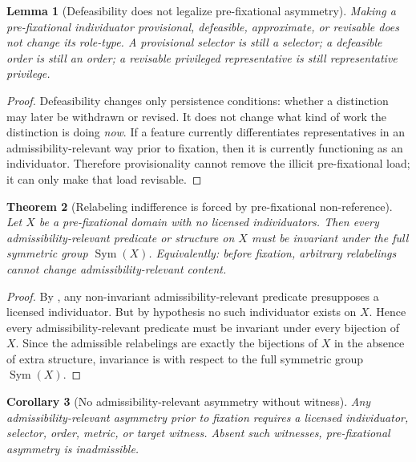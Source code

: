 \documentclass[11pt]{article}
\newtheorem{theorem}{Theorem}[section]
\newtheorem{lemma}[theorem]{Lemma}
\newtheorem{corollary}[theorem]{Corollary}
\theoremstyle{definition}
\begin{document}
\begin{lemma}[Defeasibility does not legalize pre-fixational asymmetry]
\label{lem:defeasibility-not-enough}
Making a pre-fixational individuator provisional, defeasible, approximate, or revisable does not change its role-type.
A provisional selector is still a selector; a defeasible order is still an order; a revisable privileged representative is still representative privilege.
\end{lemma}

\begin{proof}
Defeasibility changes only persistence conditions: whether a distinction may later be withdrawn or revised.
It does not change what kind of work the distinction is doing \emph{now}.
If a feature currently differentiates representatives in an admissibility-relevant way prior to fixation, then it is currently functioning as an individuator.
Therefore provisionality cannot remove the illicit pre-fixational load; it can only make that load revisable.
\end{proof}

\begin{theorem}[Relabeling indifference is forced by pre-fixational non-reference]
\label{thm:relabeling-forced}
Let $X$ be a pre-fixational domain with no licensed individuators.
Then every admissibility-relevant predicate or structure on $X$ must be invariant under the full symmetric group $\operatorname{Sym}(X)$.
Equivalently: before fixation, arbitrary relabelings cannot change admissibility-relevant content.
\end{theorem}

\begin{proof}
By , any non-invariant admissibility-relevant predicate presupposes a licensed individuator.
But by hypothesis no such individuator exists on $X$.
Hence every admissibility-relevant predicate must be invariant under every bijection of $X$.
Since the admissible relabelings are exactly the bijections of $X$ in the absence of extra structure, invariance is with respect to the full symmetric group $\operatorname{Sym}(X)$.
\end{proof}

\begin{corollary}[No admissibility-relevant asymmetry without witness]
\label{cor:no-asymmetry-without-witness}
Any admissibility-relevant asymmetry prior to fixation requires a licensed individuator, selector, order, metric, or target witness.
Absent such witnesses, pre-fixational asymmetry is inadmissible.
\end{corollary}
\end{document}
